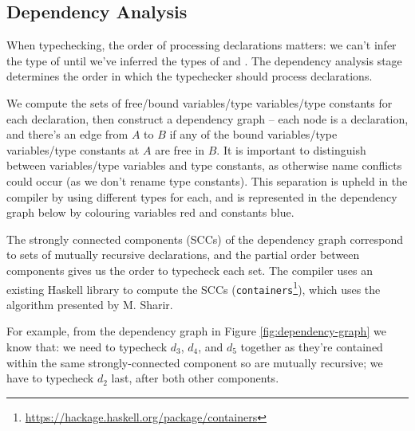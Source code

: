 \documentclass[dissertation.tex]{subfiles}
\begin{document}
{{    }
    \subsection{Dependency Analysis}\label{sec:dependency-analysis}
    {

        When typechecking, the order of processing declarations matters: we can't infer the type of  until we've inferred the types of  and . The dependency analysis stage determines
        the order in which the typechecker should process declarations.

        We compute the sets of free/bound variables/type variables/type constants for each declaration, then construct a
        dependency graph -- each node is a declaration, and there's an edge from \(A\) to \(B\) if any of the bound
        variables/type variables/type constants at \(A\) are free in \(B\). It is important to distinguish between
        variables/type variables and type constants, as otherwise name conflicts could occur (as we don't rename type
        constants). This separation is upheld in the compiler by using different types for each, and is represented in
        the dependency graph below by colouring variables red and constants blue.

        The strongly connected components (SCCs) of the dependency graph correspond to sets of mutually recursive
        declarations, and the partial order between components gives us the order to typecheck each set. The compiler
        uses an existing Haskell library to compute the SCCs
        (\texttt{containers}\footnote{\url{https://hackage.haskell.org/package/containers}}), which uses the algorithm
        presented by M. Sharir\cite{SCC}.

        For example, from the dependency graph in Figure \ref{fig:dependency-graph} we know that: we need to typecheck
        \(d_3\), \(d_4\), and \(d_5\) together as they're contained within the same strongly-connected component so are
        mutually recursive; we have to typecheck \(d_2\) last, after both other components.

}}
\end{document}
